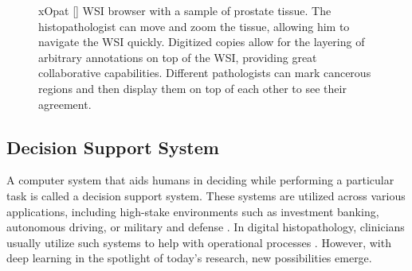\begin{figure}
    \begin{center}
    \begin{minipage}{0.80\textwidth}
    \end{minipage}
    \caption{xOpat [] WSI browser with a sample of prostate tissue. The histopathologist can move and zoom the tissue, allowing him to navigate the WSI quickly. Digitized copies allow for the layering of arbitrary annotations on top of the WSI, providing great collaborative capabilities. Different pathologists can mark cancerous regions and then display them on top of each other to see their agreement.}
    \label{fig:xopat}
    \end{center}
\end{figure}

\subsection*{Decision Support System}

A computer system that aids humans in deciding while performing a particular task is called a decision support system. 
These systems are utilized across various applications, including high-stake environments such as investment banking, autonomous driving, or military and defense \cite{dss-finance, dss-autonomous-driving, dss-military-and-defense}. In digital histopathology, clinicians usually utilize such systems to help with operational processes \cite{digital-histopathology-process}.
However, with deep learning in the spotlight of today's research, new possibilities emerge.

